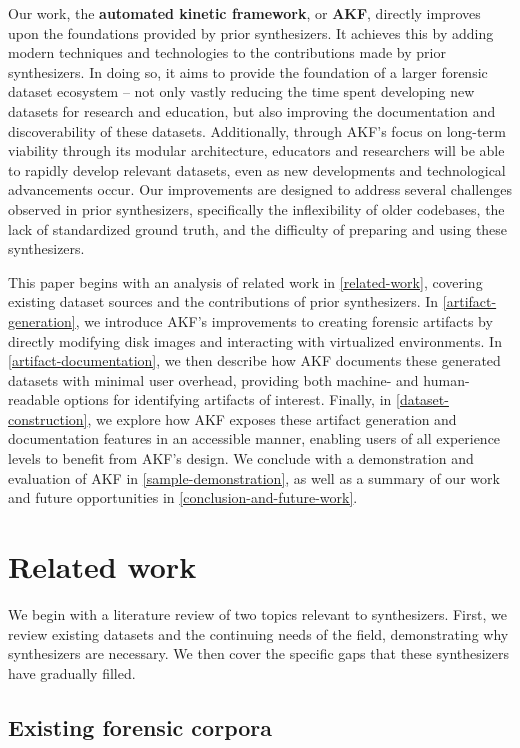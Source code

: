 \documentclass[final,5p,times,twocolumn]{elsarticle}
\begin{document}
Our work, the \textbf{automated kinetic framework}, or \textbf{AKF},
directly improves upon the foundations provided by prior synthesizers.
It achieves this by adding modern techniques and technologies to the
contributions made by prior synthesizers. In doing so, it aims to
provide the foundation of a larger forensic dataset ecosystem -- not
only vastly reducing the time spent developing new datasets for research
and education, but also improving the documentation and discoverability
of these datasets. Additionally, through AKF's focus on long-term
viability through its modular architecture, educators and researchers
will be able to rapidly develop relevant datasets, even as new
developments and technological advancements occur. Our improvements are
designed to address several challenges observed in prior synthesizers,
specifically the inflexibility of older codebases, the lack of
standardized ground truth, and the difficulty of preparing and using
these synthesizers.

This paper begins with an analysis of related work in \autoref{related-work}, covering existing dataset sources and the contributions of prior
synthesizers. In \autoref{artifact-generation}, we introduce AKF's
improvements to creating forensic artifacts by directly modifying disk
images and interacting with virtualized environments. In
\autoref{artifact-documentation}, we then describe how AKF documents
these generated datasets with minimal user overhead, providing both
machine- and human-readable options for identifying artifacts of
interest. Finally, in \autoref{dataset-construction}, we explore how
AKF exposes these artifact generation and documentation features in an
accessible manner, enabling users of all experience levels to benefit
from AKF's design. We conclude with a demonstration and evaluation of
AKF in \autoref{sample-demonstration}, as well as a summary of our work
and future opportunities in \autoref{conclusion-and-future-work}.

\section{Related work}\label{related-work}

We begin with a literature review of two topics relevant to
synthesizers. First, we review existing datasets and the continuing
needs of the field, demonstrating why synthesizers are necessary. We
then cover the specific gaps that these synthesizers have gradually
filled.

\subsection{Existing forensic corpora}\label{existing-forensic-corpora}
\end{document}
